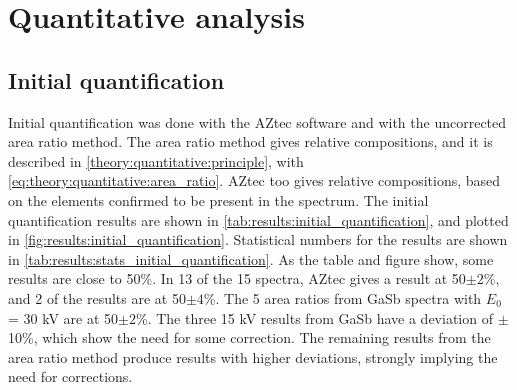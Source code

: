 
\clearpage

















\section{Quantitative analysis}
\label{results:quantitative}




\subsection{Initial quantification}
\label{results:initial_quantification}

Initial quantification was done with the AZtec software and with the uncorrected area ratio method.
The area ratio method gives relative compositions, and it is described in \cref{theory:quantitative:principle}, with \cref{eq:theory:quantitative:area_ratio}.
AZtec too gives relative compositions, based on the elements confirmed to be present in the spectrum.
The initial quantification results are shown in \cref{tab:results:initial_quantification}, and plotted in \cref{fig:results:initial_quantification}.
Statistical numbers for the results are shown in \cref{tab:results:stats_initial_quantification}.
As the table and figure show, some results are close to 50\%.
In 13 of the 15 spectra, AZtec gives a result at 50$\pm2$\%, and 2 of the results are at 50$\pm4$\%.
The 5 area ratios from GaSb spectra with $E_0$ = 30 kV are at 50$\pm2$\%.
The three 15 kV results from GaSb have a deviation of $\pm$ 10\%, which show the need for some correction.
The remaining results from the area ratio method produce results with higher deviations, strongly implying the need for corrections.


